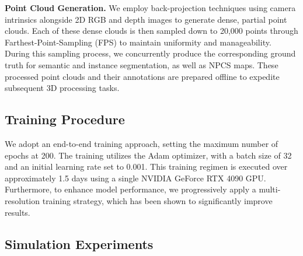 \documentclass[conference]{IEEEtran}
\begin{document}
\textbf{Point Cloud Generation.} We employ back-projection techniques using camera intrinsics alongside 2D RGB and depth images to generate dense, partial point clouds. Each of these dense clouds is then sampled down to 20,000 points through Farthest-Point-Sampling (FPS) to maintain uniformity and manageability. During this sampling process, we concurrently produce the corresponding ground truth for semantic and instance segmentation, as well as NPCS maps. These processed point clouds and their annotations are prepared offline to expedite subsequent 3D processing tasks.

\subsection{Training Procedure}
We adopt an end-to-end training approach, setting the maximum number of epochs at 200. The training utilizes the Adam optimizer, with a batch size of 32 and an initial learning rate set to 0.001. This training regimen is executed over approximately 1.5 days using a single NVIDIA GeForce RTX 4090 GPU. Furthermore, to enhance model performance, we progressively apply a multi-resolution training strategy, which has been shown to significantly improve results.






\subsection{Simulation Experiments}
\end{document}
